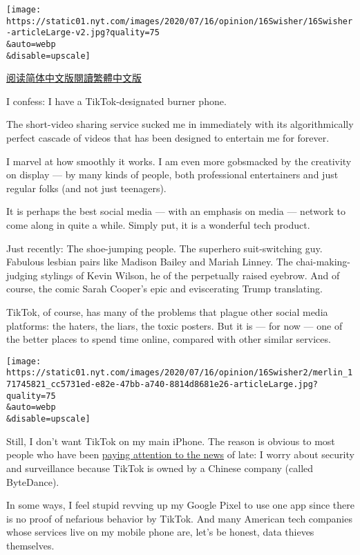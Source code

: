\texttt{[image: https://static01.nyt.com/images/2020/07/16/opinion/16Swisher/16Swisher-articleLarge-v2.jpg?quality=75\\\&auto=webp\\\&disable=upscale]}

\href{https://cn.nytimes.com/opinion/20200720/tiktok-ban-china/}{阅读简体中文版}\href{https://cn.nytimes.com/opinion/20200720/tiktok-ban-china/zh-hant/}{閱讀繁體中文版}

I confess: I have a TikTok-designated burner phone.

The short-video sharing service sucked me in immediately with its
algorithmically perfect cascade of videos that has been designed to
entertain me for forever.

I marvel at how smoothly it works. I am even more gobsmacked by the
creativity on display --- by many kinds of people, both professional
entertainers and just regular folks (and not just teenagers).

It is perhaps the best social media --- with an emphasis on media ---
network to come along in quite a while. Simply put, it is a wonderful
tech product.

Just recently: The shoe-jumping people. The superhero suit-switching
guy. Fabulous lesbian pairs like Madison Bailey and Mariah Linney. The
chai-making-judging stylings of Kevin Wilson, he of the perpetually
raised eyebrow. And of course, the comic Sarah Cooper's epic and
eviscerating Trump translating.

TikTok, of course, has many of the problems that plague other social
media platforms: the haters, the liars, the toxic posters. But it is ---
for now --- one of the better places to spend time online, compared with
other similar services.

\texttt{[image: https://static01.nyt.com/images/2020/07/16/opinion/16Swisher2/merlin\_171745821\_cc5731ed-e82e-47bb-a740-8814d8681e26-articleLarge.jpg?quality=75\\\&auto=webp\\\&disable=upscale]}

Still, I don't want TikTok on my main iPhone. The reason is obvious to
most people who have been
\href{https://www.nytimes.com/2020/07/15/technology/tiktok-washington-lobbyist.html}{paying
attention to the news} of late: I worry about security and surveillance
because TikTok is owned by a Chinese company (called ByteDance).

In some ways, I feel stupid revving up my Google Pixel to use one app
since there is no proof of nefarious behavior by TikTok. And many
American tech companies whose services live on my mobile phone are,
let's be honest, data thieves themselves.

